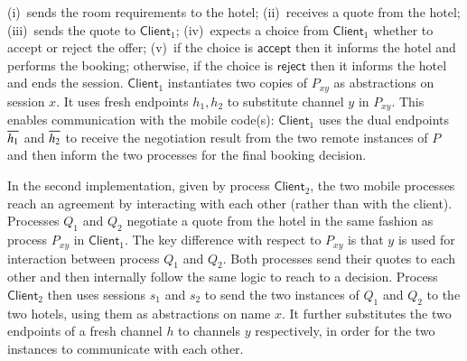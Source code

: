 \documentclass[preprint,11pt]{elsarticle}
\newcommand{\accept}{\mathsf{accept}}
\newcommand{\reject}{\mathsf{reject}}
\newcommand{\Client}{\mathsf{Client}}
\begin{document}
{{		%
		(i)~sends the room requirements to the hotel;
		(ii)~receives a quote from the hotel;
		(iii)~sends the quote to  $\Client_1$;
		(iv)~expects a choice from   $\Client_1$ whether to accept or reject the offer;
		(v)~if the choice is $\accept$ then it informs the hotel and performs the booking;
		otherwise, if the choice is $\reject$ then it informs the hotel and ends the session.
				$\Client_1$ instantiates two copies of  $P_{xy}$ as abstractions
		on session $x$. It uses 
		fresh endpoints $h_1, h_2$ to substitute channel $y$
		in $P_{xy}$. This enables communication with the mobile code(s): 
		$\Client_1$ uses the dual endpoints $\overline{h_1}$ and $\overline{h_2}$
		to receive the negotiation
		result from the two remote instances of $P$ and then inform the two
		processes for the final booking decision.

In the second implementation, given by process $\Client_2$,  
the two mobile processes reach an agreement
by interacting with each other (rather than with the client).
Processes $Q_1$ and $Q_2$  negotiate a quote from the
		hotel in the same fashion as process $P_{xy}$ in $\Client_1$.
		The key difference with respect to $P_{xy}$ is that $y$ is used for
		interaction between process $Q_1$ and $Q_2$. Both processes send
		their quotes to each other and then internally follow the same
		logic to reach to a decision.
		Process  $\Client_2$ then uses sessions $s_1$ and $s_2$ to send the two
		instances of $Q_1$ and $Q_2$ to the two hotels, using them 
	 as abstractions
		on name $x$. It further substitutes
		the two endpoints of a fresh channel $h$ to channels $y$ respectively,
		in order for the two instances to communicate with each other.



%
%

}}
\end{document}
